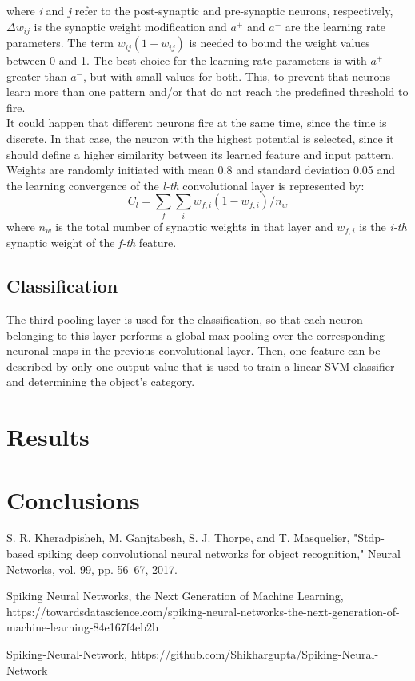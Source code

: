 \documentclass[11pt,a4paper]{scrartcl}
\begin{document}
where \textit{i} and \textit{j} refer to the post-synaptic and pre-synaptic neurons, respectively, $ \Delta w_{ij} $ is the synaptic weight modification and $ a^{+} $ and $ a^{-} $ are the learning rate parameters. The term $ w_{ij}(1-w_{ij}) $ is needed to bound the weight values between 0 and 1. The best choice for the learning rate parameters is with $ a^{+} $ greater than $ a^{-} $, but with small values for both. This, to prevent that neurons learn more than one pattern and/or that do not reach the predefined threshold to fire.\\
It could happen that different neurons fire at the same time, since the time is discrete. In that case, the neuron with the highest potential is selected, since it should define a higher similarity between its learned feature and input pattern.\\
Weights are randomly initiated with mean 0.8 and standard deviation 0.05 and the learning convergence of the \textit{l-th} convolutional layer is represented by:
\begin{equation*}
C_{l} = \sum_{f}\sum_{i}w_{f,i}(1-w_{f,i})/n_{w}
\end{equation*}
where $ n_{w} $ is the total number of synaptic weights in that layer and $ w_{f,i} $ is the \textit{i-th} synaptic weight of the \textit{f-th} feature.

\subsection{Classification}
The third pooling layer is used for the classification, so that each neuron belonging to this layer performs a global max pooling over the corresponding neuronal maps in the previous convolutional layer. Then, one feature can be described by only one output value that is used to train a linear SVM classifier and determining the object's category.
\section{Results}

\section{Conclusions}

\clearpage

\begin{thebibliography}{5}

S. R. Kheradpisheh, M. Ganjtabesh, S. J. Thorpe, and
T. Masquelier, "Stdp-based spiking deep convolutional neural
networks for object recognition," Neural Networks, vol. 99,
pp. 56–67, 2017.

Spiking Neural Networks, the Next Generation of Machine Learning, https://towardsdatascience.com/spiking-neural-networks-the-next-generation-of-machine-learning-84e167f4eb2b

Spiking-Neural-Network, https://github.com/Shikhargupta/Spiking-Neural-Network
\end{thebibliography}
\end{document}
